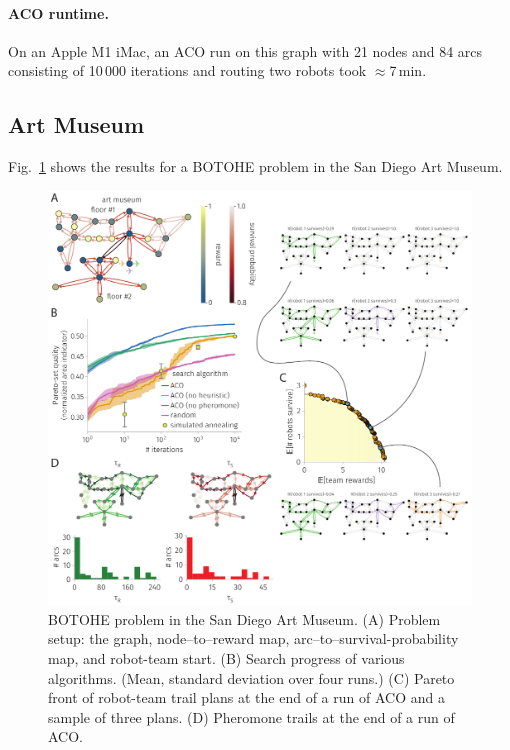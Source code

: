 \documentclass[fleqn,10pt,lineno]{wlpeerj}
\begin{document}
\paragraph{ACO runtime.} On an Apple M1 iMac, an ACO run on this graph with 21 nodes and 84 arcs consisting of 10\,000 iterations and routing two robots took $\approx$7\,min.



\subsection{Art Museum}
Fig.~\ref{fig:art_museum} shows the results for a BOTOHE problem in the San Diego Art Museum.

\begin{figure}[h!]
    \centering
    	\includegraphics[width=\textwidth]{art_museum_results.pdf}
    \caption{
    BOTOHE problem in the San Diego Art Museum. 
    (A) Problem setup: the graph, node--to--reward map, arc--to--survival-probability map, and robot-team start.
    (B) Search progress of various algorithms. (Mean, standard deviation over four runs.)
    (C) Pareto front of robot-team trail plans at the end of a run of ACO and a sample of three plans.
    (D) Pheromone trails at the end of a run of ACO.
    } \label{fig:art_museum}
\end{figure}
\end{document}
